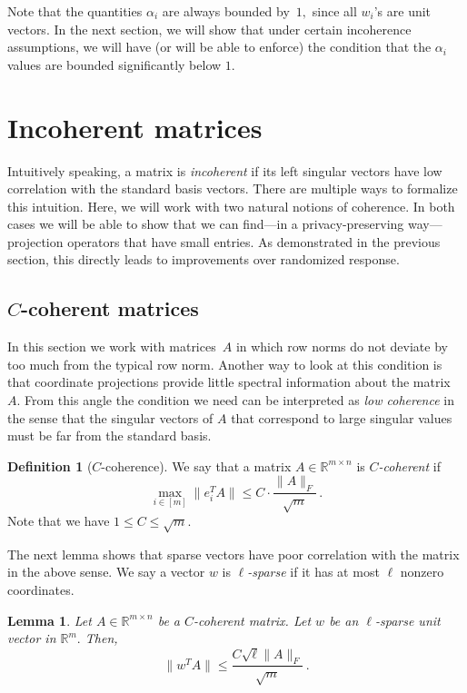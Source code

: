 \documentclass[letterpaper,11pt]{article}
\newtheorem{lemma}[theorem]{Lemma}
\theoremstyle{definition}
\newtheorem{definition}[theorem]{Definition}
\newcommand{\definitionlabel}[1]{\label{def:#1}}
\newcommand{\lemmalabel}[1]{\label{lem:#1}}
\newcommand{\sectionlabel}[1]{\label{sec:#1}}
\newcommand{\mper}{\,.}
\renewcommand{\le}{\leqslant}
\newcommand{\R}{\mathbb{R}}
\begin{document}
Note that the quantities $\alpha_i$ are always bounded by~$1,$ since all $w_i$'s are unit
vectors. In the next section, we will show that under certain incoherence assumptions, we will have (or will be able to enforce) the condition that the $\alpha_i$ values are bounded significantly below $1$.



\section{Incoherent matrices}
\sectionlabel{incoherent}

Intuitively speaking, a matrix is \emph{incoherent} if its left singular vectors
have low correlation with the standard basis vectors. There are multiple ways to
formalize this intuition. Here, we will work with two natural notions of
coherence. In both cases we will be able to show that we can find---in a
privacy-preserving way---projection operators that have small entries. As
demonstrated in the previous section, this directly leads to improvements over
randomized response.

\subsection{$C$-coherent matrices}

In this section we work with matrices~$A$ in which row norms do not deviate by
too much from the typical row norm.
Another way to look at this condition is that coordinate projections
provide little spectral information about the matrix $A.$ From this angle the
condition we need can be interpreted as \emph{low coherence} in the sense that
the singular vectors of $A$ that correspond to large singular values
must be far from the standard basis.

\begin{definition}[$C$-coherence]
\definitionlabel{C-coherence}
We say that a matrix $A\in\R^{m\times n}$ is \emph{$C$-coherent} if
\[
\max_{i\in[m]}\|e_i^TA\|\le C\cdot\frac{\|A\|_F}{\sqrt{m}}\mper
\]
Note that we have $1\le C\le \sqrt{m}.$
\end{definition}

The next lemma shows that sparse vectors have poor correlation with the matrix
in the above sense. We say a vector $w$ is \emph{$\ell$-sparse} if it has at
most $\ell$ nonzero coordinates.

\begin{lemma}
\lemmalabel{sparse-vector}
Let $A\in\R^{m\times n}$ be a $C$-coherent matrix.
Let $w$ be an $\ell$-sparse unit vector in $\R^m.$
Then,
\[
\|w^TA\| \le \frac{C\sqrt{\ell}\|A\|_F}{\sqrt{m}}\mper
\]
\end{lemma}
\end{document}
